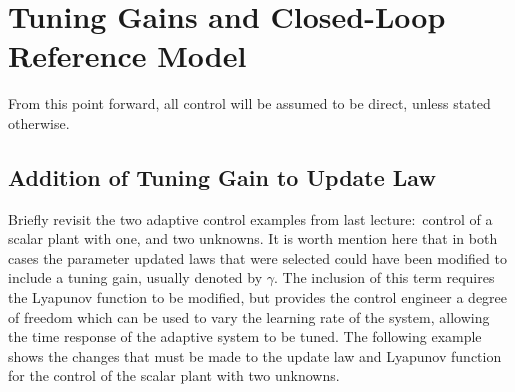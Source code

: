 \section{Tuning Gains and Closed-Loop Reference Model}


From this point forward, all control will be assumed to be direct, unless stated otherwise.

\subsection{Addition of Tuning Gain to Update Law}

Briefly revisit the two adaptive control examples from last lecture:\ control of a scalar plant with one, and two unknowns.
It is worth mention here that in both cases the parameter updated laws that were selected could have been modified to include a tuning gain, usually denoted by $\gamma$.
The inclusion of this term requires the Lyapunov function to be modified, but provides the control engineer a degree of freedom which can be used to vary the learning rate of the system, allowing the time response of the adaptive system to be tuned.
The following example shows the changes that must be made to the update law and Lyapunov function for the control of the scalar plant with two unknowns.

